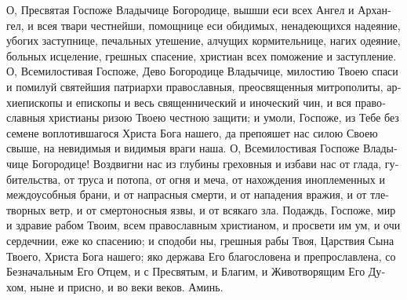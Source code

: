 \begin{russian}

  \begin{center}
    {\color{Maroon}{\large Молитва}}
  \end{center}

  \Ierei О, Пресвятая Госпоже Владычице Богородице, вышши еси всех Ангел и Архангел, и всея твари честнейши, помощнице еси обидимых, ненадеющихся надеяние, убогих заступнице, печальных утешение, алчущих кормительнице, нагих одеяние, больных исцеление, грешных спасение, христиан всех поможение и заступление. О, Всемилостивая Госпоже, Дево Богородице Владычице, милостию Твоею спаси и помилуй святейшия патриархи православныя, преосвященныя митрополиты, архиепископы и епископы и весь священнический и иноческий чин, и вся православныя христианы ризою Твоею честною защити; и умоли, Госпоже, из Тебе без семене воплотившагося Христа Бога нашего, да препояшет нас силою Своею свыше, на невидимыя и видимыя враги наша. О, Всемилостивая Госпоже Владычице Богородице! Воздвигни нас из глубины греховныя и избави нас от глада, губительства, от труса и потопа, от огня и меча, от нахождения иноплеменных и междоусобныя брани, и от напрасныя смерти, и от нападения вражия, и от тлетворных ветр, и от смертоносныя язвы, и от всякаго зла. Подаждь, Госпоже, мир и здравие рабом Твоим, всем православным христианом, и просвети им ум, и очи сердечнии, еже ко спасению; и сподоби ны, грешныя рабы Твоя, Царствия Сына Твоего, Христа Бога нашего; яко держава Его благословена и препрославлена, со Безначальным Его Отцем, и с Пресвятым, и Благим, и Животворящим Его Духом, ныне и присно, и во веки веков. Аминь.

\end{russian}
